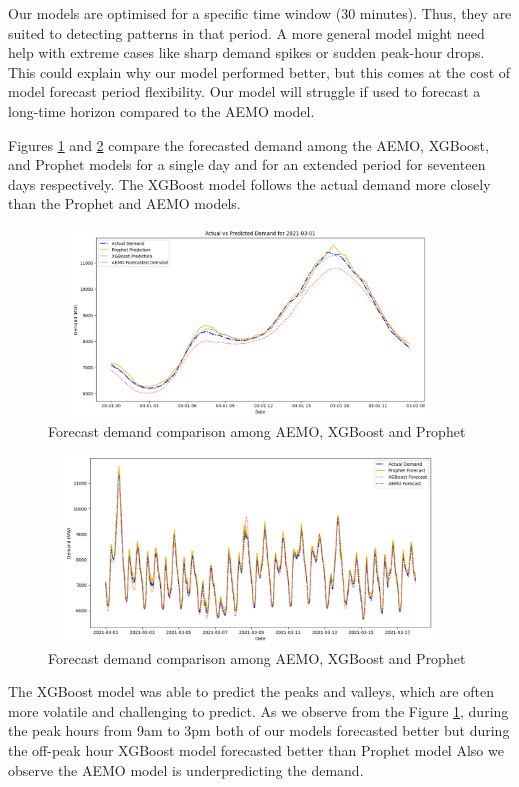 \documentclass[mstat,12pt]{unswthesis}
\begin{document}
Our models are optimised for a specific time window (30 minutes). Thus,
they are suited to detecting patterns in that period. A more general
model might need help with extreme cases like sharp demand spikes or
sudden peak-hour drops. This could explain why our model performed
better, but this comes at the cost of model forecast period flexibility.
Our model will struggle if used to forecast a long-time horizon compared
to the AEMO model.

Figures \ref{AEMO_Prophet_XGBoost} and \ref{AEMO_Prophet_XGBoost_17}
compare the forecasted demand among the AEMO, XGBoost, and Prophet
models for a single day and for an extended period for seventeen days
respectively. The XGBoost model follows the actual demand more closely
than the Prophet and AEMO models.

\begin{figure}[H]
\centering
\includegraphics[width=0.95\textwidth, height=5cm]{AEMO_Prophet_XGBoost.png}
\caption{Forecast demand comparison among AEMO, XGBoost and Prophet}\label{AEMO_Prophet_XGBoost}
\end{figure}

\begin{figure}[H]
\centering
\includegraphics[width=0.95\textwidth, height=5cm]{AEMO_Prophet_XGBoost_17.png}
\caption{Forecast demand comparison among AEMO, XGBoost and Prophet}\label{AEMO_Prophet_XGBoost_17}
\end{figure}

The XGBoost model was able to predict the peaks and valleys, which are
often more volatile and challenging to predict. As we observe from the
Figure \ref{AEMO_Prophet_XGBoost}, during the peak hours from 9am to 3pm
both of our models forecasted better but during the off-peak hour
XGBoost model forecasted better than Prophet model Also we observe the
AEMO model is underpredicting the demand.
\end{document}
